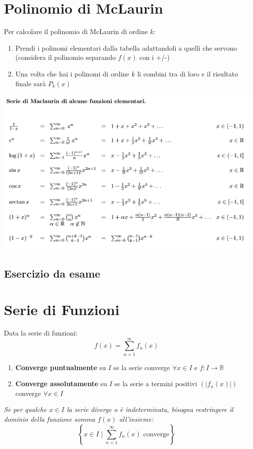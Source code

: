 \documentclass[12pt, a4paper]{article}
\begin{document}
\section{Polinomio di McLaurin}
    Per calcolare il polinomio di McLaurin di ordine $k$:
    \begin{enumerate}
        \item Prendi i polinomi elementari dalla tabella adattandoli a quelli che servono (considera il polinomio separando $f(x)$ con i +/-)
        \item Una volta che hai i polinomi di ordine $k$ li combini tra di loro e il risultato finale sarà $P_k(x)$
    \end{enumerate}
    \begin{center}
        \includegraphics[width = \textwidth]{Images/seriedimaclaurin.png}
    \end{center}
    \subsection{Esercizio da esame}
\section{Serie di Funzioni}
    Data la serie di funzioni:
    \begin{equation*}
        f(x) = \sum_{n=1}^{\infty}f_n(x)
    \end{equation*}
    \begin{enumerate}
        \item \textbf{Converge puntualmente} su $I$ se la serie converge $\forall x\in I$ e $f:I\rightarrow\mathbb{R}$
        \item \textbf{Converge assolutamente} su $I$ se la serie a termini positivi $\left(\left|f_n(x)\right|\right)$ converge $\forall x\in I$
    \end{enumerate}
    \textit{Se per qualche $x\in I$ la serie diverge o è indeterminata, bisogna restringere il dominio della funzione somma $f(x)$ all'insieme:} \begin{equation*}
        \left\{x\in I \mid \sum_{n=1}^{\infty}f_n(x) \text{ converge}\right\}
    \end{equation*}
\end{document}
